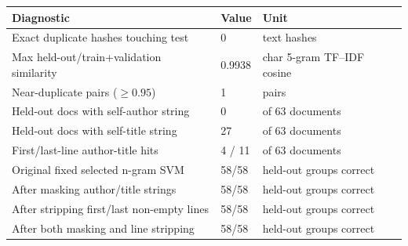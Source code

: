 \begin{table}
  {\tablefont\begin{tabular}{p{}p{}p{}}
    \hline
    Diagnostic & Value & Unit\\
    \hline
    Exact duplicate hashes touching test & 0 & text hashes\\
    Max held-out/train+validation similarity & 0.9938 & char 5-gram TF--IDF cosine\\
    Near-duplicate pairs ($\geq 0.95$) & 1 & pairs\\
    Held-out docs with self-author string & 0 & of 63 documents\\
    Held-out docs with self-title string & 27 & of 63 documents\\
    First/last-line author-title hits & 4 / 11 & of 63 documents\\
    Original fixed selected n-gram SVM & 58/58 & held-out groups correct\\
    After masking author/title strings & 58/58 & held-out groups correct\\
    After stripping first/last non-empty lines & 58/58 & held-out groups correct\\
    After both masking and line stripping & 58/58 & held-out groups correct\\
    \hline
  \end{tabular}}
  {}
\end{table}

